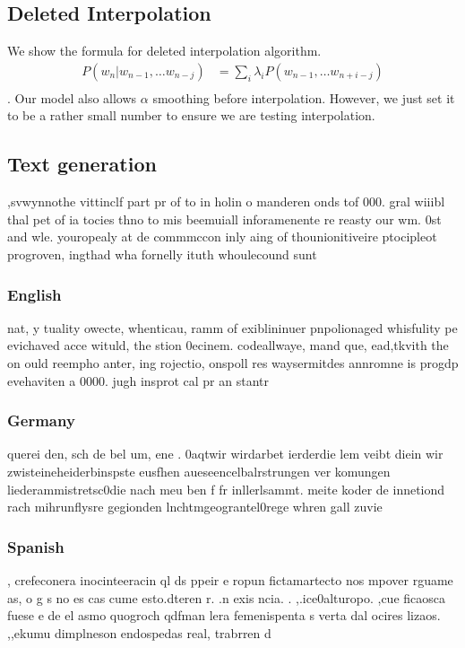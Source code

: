 \documentclass{article}
\begin{document}
\subsection{Deleted Interpolation}
We show the formula for deleted interpolation algorithm.
\begin{eqnarray*}
P(w_n| w_{n-1},\dots w_{n-j}) &= \sum_i \lambda_i P(w_{n-1},\dots w_{n+i-j})\\
\end{eqnarray*}
.
Our model also allows $\alpha$ smoothing before interpolation. However, we just set it to be a rather small number to ensure we are testing interpolation.
\subsection{Text generation}
,svwynnothe vittinclf part pr of to in holin o manderen onds tof 000.
 gral wiiibl thal pet of ia tocies thno to mis beemuiall inforamenente re reasty our wm.
0st and wle.
 youropealy at de commmccon inly aing of thounionitiveire ptocipleot progroven, ingthad wha fornelly ituth whoulecound sunt
\subsubsection{English}
 nat, y tuality owecte, whenticau, ramm of exiblininuer pnpolionaged whisfulity pe evichaved acce wituld, the stion
0ecinem.
  codeallwaye, mand que, ead,tkvith the on ould reempho anter, ing rojectio, onspoll res waysermitdes annromne is progdp evehaviten a 0000.
 jugh insprot cal pr an stantr
\subsubsection{Germany}
 querei den, sch de bel um, ene .
0aqtwir wirdarbet ierderdie lem veibt diein wir zwisteineheiderbinspste eusfhen aueseencelbalrstrungen ver komungen liederammistretsc0die nach meu ben f fr inllerlsammt.
 meite koder de innetiond rach mihrunflysre gegionden lnchtmgeograntel0rege whren gall zuvie
\subsubsection{Spanish}
, crefeconera inocinteeracin ql ds ppeir e ropun fictamartecto nos mpover rguame as, o g s no es cas cume esto.dteren r.
.n exis ncia.
.
,.ice0alturopo.
,cue ficaosca fuese e de el asmo quogroch qdfman lera femenispenta s verta dal ocires lizaos.
,,ekumu dimplneson endospedas real, trabrren d
\end{document}
